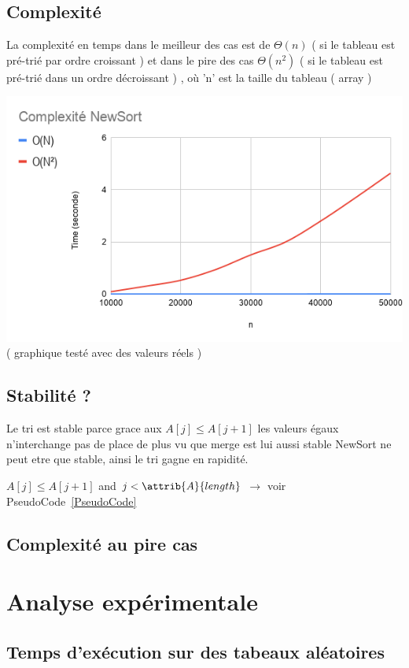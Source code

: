 \documentclass[a4paper, 11pt, oneside]{article}
\begin{document}
\subsection{Complexité}
La complexité en temps dans le meilleur des cas est de $\Theta(n)$ ( si le tableau est pré-trié par ordre croissant ) et dans le pire des cas $\Theta(n^{2})$ ( si le tableau est pré-trié dans un ordre décroissant ) , où 'n' est la taille du tableau ( array )

\includegraphics[scale=0.5]{graphique.png} \\
( graphique testé avec des valeurs réels ) %


\subsection{Stabilité ?}
Le tri est stable parce grace aux $A[j]\leq A[j+1]$ les valeurs égaux n'interchange pas de place de plus vu que merge est lui aussi stable NewSort ne peut etre que stable, ainsi le tri gagne en rapidité.
	\begin{codebox}

\li \While $A[j] \leq A[j+1]$ and $j < \attrib{A}{length}$
$\longrightarrow$ voir PseudoCode~\ref{PseudoCode}
\End
\end{codebox} 
\newpage
\subsection{Complexité au pire cas}
\newpage

\section{Analyse expérimentale}
\subsection{Temps d'exécution sur des tabeaux aléatoires}
\end{document}
